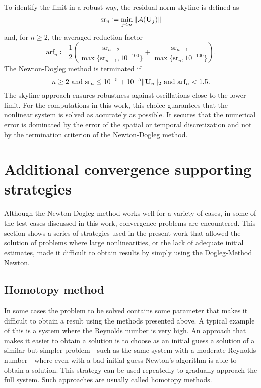 To identify the limit in a robust way, the residual-norm skyline is defined as
\begin{equation}
	\textrm{sr}_n \coloneqq \min_{j \leq n} \| \mathcal{A}(\textbf{U}_j) \|
\end{equation}
and, for $n \geq 2$, the averaged reduction factor
\begin{equation}
	\textrm{arf}_n \coloneqq \frac{1}{2} \left(
	\frac{ \textrm{sr}_{n-2} }{  \max \{ \textrm{sr}_{n-1}, 10^{-100} \} }
	+  \frac{ \textrm{sr}_{n-1} }{  \max \{ \textrm{sr}_{n},   10^{-100} \} }
	\right) .
\end{equation}
The Newton-Dogleg method is terminated if
\begin{equation}
	n \geq 2 \text{ and }
	\textrm{sr}_n \leq 10^{-5} + 10^{-5} \| \textbf{U}_n \|_2 \text{ and }
	\textrm{arf}_n < 1.5 .
\end{equation}
The skyline approach ensures robustness against oscillations close to the lower limit. For the computations in this work, this choice guarantees that the nonlinear system is solved as accurately as possible. It secures that the numerical error is dominated by the error of the spatial or temporal discretization and not by the termination criterion of the Newton-Dogleg method. 


\section{Additional convergence supporting strategies}\label{sec:ConvSupportStrat}
Although the Newton-Dogleg method works well for a variety of cases, in some of the test cases discussed in this work, convergence problems are encountered. This section shows a series of strategies used in the present work that allowed the solution of problems where large nonlinearities, or the lack of adequate initial estimates, made it difficult to obtain results by simply using the Dogleg-Method Newton. 

\subsection{Homotopy method} \label{sec:HomotopyMethod}

In some cases the problem to be solved contains some parameter that makes it difficult to obtain a result using the methods presented above. A typical example of this is a system where the Reynolds number is very high. An approach that makes it easier to obtain a solution is to choose as an initial guess a solution of a similar but simpler problem - such as the same system with a moderate Reynolds number - where even with a bad initial guess Newton's algorithm is able to obtain a solution. This strategy can be used repeatedly to gradually approach the full system. Such approaches are usually called homotopy methods. 

